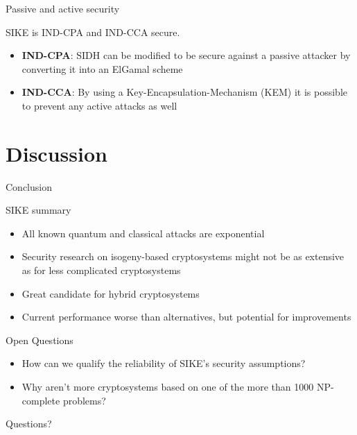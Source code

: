 \documentclass{beamer}
\begin{document}
\begin{frame}{Passive and active security}

SIKE is IND-CPA and IND-CCA secure.

\begin{itemize}[\textbullet]
	\item \textbf{IND-CPA}: SIDH can be modified to be secure against a passive attacker by converting it into an ElGamal scheme
	\item \textbf{IND-CCA}: By using a Key-Encapsulation-Mechanism (KEM) it is possible to prevent any active attacks as well
\end{itemize}

\end{frame}

\section{Discussion}

\begin{frame}{Conclusion}

SIKE summary
\begin{itemize}[\textbullet]
	
	\item All known quantum and classical attacks are exponential\pause
	\item Security research on isogeny-based cryptosystems might not be as extensive as for less complicated cryptosystems\pause
	\item Great candidate for hybrid cryptosystems\pause
	\item Current performance worse than alternatives, but potential for improvements\pause
\end{itemize}
\vfill
Open Questions
\begin{itemize}[\textbullet]
	\item How can we qualify the reliability of SIKE's security assumptions?\pause
	\item Why aren't more cryptosystems based on one of the more than 1000 NP-complete problems? 
\end{itemize}
\end{frame}

\begin{frame}{Questions?}

\end{frame}
\end{document}
